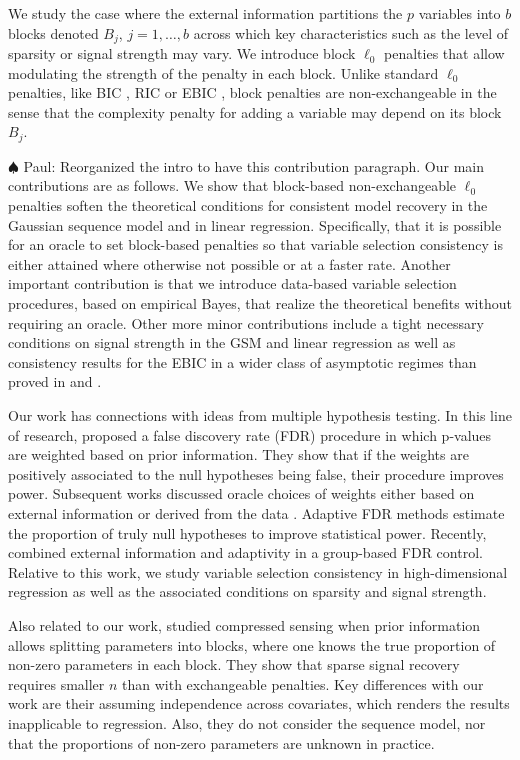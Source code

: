 \documentclass[aos]{imsart}
\theoremstyle{plain}
\newcommand{\paul}[1]{{\small{\color{green} \sf $\spadesuit$ Paul: #1}}}
\begin{document}
We study the case where the external information partitions the $p$ variables into $b$ blocks denoted $B_j$, $j=1,\ldots,b$ across which key characteristics such as the level of sparsity or signal strength may vary. We introduce block $\ell_0$ penalties that allow modulating the strength of the penalty in each block. Unlike standard $\ell_0$ penalties, like BIC \cite{BIC}, RIC \cite{RIC} or EBIC \cite{EBIC}, block penalties are non-exchangeable in the sense that the complexity penalty for adding a variable may depend on its block $B_j$.

\paul{Reorganized the intro to have this contribution paragraph.}
Our main contributions are as follows. We show that block-based non-exchangeable $\ell_0$ penalties soften the theoretical conditions for consistent model recovery in the Gaussian sequence model and in linear regression.
Specifically, that it is possible for an oracle to set block-based penalties so that variable selection consistency is either attained where otherwise not possible or at a faster rate. Another important contribution is that we introduce data-based variable selection procedures, based on empirical Bayes, that realize the theoretical benefits without requiring an oracle. Other more minor contributions include a tight necessary conditions on signal strength in the GSM and linear regression as well as consistency results for the EBIC in a wider class of asymptotic regimes than proved in \cite{EBIC} and \cite{ebicdiverging}.

Our work has connections with ideas from multiple hypothesis testing. In this line of research, \cite{genovese2006} proposed a false discovery rate (FDR) procedure in which p-values are weighted based on prior information. They show that if the weights are positively associated to the null hypotheses being false, their procedure improves power. Subsequent works discussed oracle choices of weights either based on external information or derived from the data \cite{roederwasserman,basu}. 
Adaptive FDR methods \cite{blanchard} estimate the
proportion of truly null hypotheses to improve statistical power.
Recently, \cite{ramdas2019prior} combined external information and adaptivity in a group-based FDR control. 
Relative to this work, we study variable selection consistency in high-dimensional regression as well as the associated conditions on sparsity and signal strength.

Also related to our work, \cite{scarlett2012compressed} studied compressed sensing when prior information allows splitting parameters into blocks, where one knows the true proportion of non-zero parameters in each block. They show that sparse signal recovery requires smaller $n$ than with exchangeable penalties. Key differences with our work are their assuming independence across covariates, which renders the results inapplicable to regression. Also, they do not consider the sequence model, nor that the proportions of non-zero parameters are unknown in practice.
\end{document}
